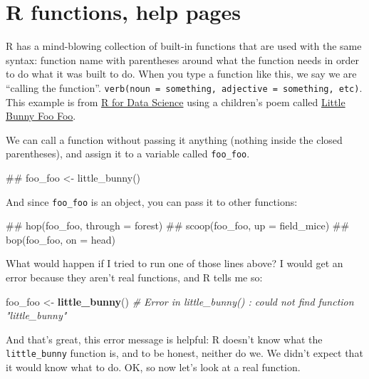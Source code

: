 \documentclass[]{book}
\newenvironment{Shaded}{\begin{snugshade}}{\end{snugshade}}
\newcommand{\KeywordTok}[1]{\textcolor[rgb]{0.13,0.29,0.53}{\textbf{{#1}}}}
\newcommand{\StringTok}[1]{\textcolor[rgb]{0.31,0.60,0.02}{{#1}}}
\newcommand{\CommentTok}[1]{\textcolor[rgb]{0.56,0.35,0.01}{\textit{{#1}}}}
\newcommand{\NormalTok}[1]{{#1}}
\theoremstyle{definition}
\theoremstyle{definition}
\theoremstyle{definition}
\theoremstyle{remark}
\begin{document}
\section{R functions, help pages}\label{r-functions-help-pages}

R has a mind-blowing collection of built-in functions that are used with
the same syntax: function name with parentheses around what the function
needs in order to do what it was built to do. When you type a function
like this, we say we are ``calling the function''.
\texttt{verb(noun\ =\ something,\ adjective\ =\ something,\ etc)}. This
example is from \href{http://r4ds.had.co.nz/pipes}{R for Data Science}
using a children's poem called
\href{https://en.wikipedia.org/wiki/Little_Bunny_Foo_Foo}{Little Bunny
Foo Foo}.

We can call a function without passing it anything (nothing inside the
closed parentheses), and assign it to a variable called
\texttt{foo\_foo}.

\begin{Shaded}
\begin{Highlighting}[]
\NormalTok{## foo_foo <- little_bunny()}
\end{Highlighting}
\end{Shaded}

And since \texttt{foo\_foo} is an object, you can pass it to other
functions:

\begin{Shaded}
\begin{Highlighting}[]
\NormalTok{## hop(foo_foo, through = forest) }
\NormalTok{## scoop(foo_foo, up = field_mice) }
\NormalTok{## bop(foo_foo, on = head)}
\end{Highlighting}
\end{Shaded}

What would happen if I tried to run one of those lines above? I would
get an error because they aren't real functions, and R tells me so:

\begin{Shaded}
\begin{Highlighting}[]
\NormalTok{foo_foo <-}\StringTok{ }\KeywordTok{little_bunny}\NormalTok{()}
\CommentTok{# Error in little_bunny() : could not find function "little_bunny"}
\end{Highlighting}
\end{Shaded}

And that's great, this error message is helpful: R doesn't know what the
\texttt{little\_bunny} function is, and to be honest, neither do we. We
didn't expect that it would know what to do. OK, so now let's look at a
real function.
\end{document}
